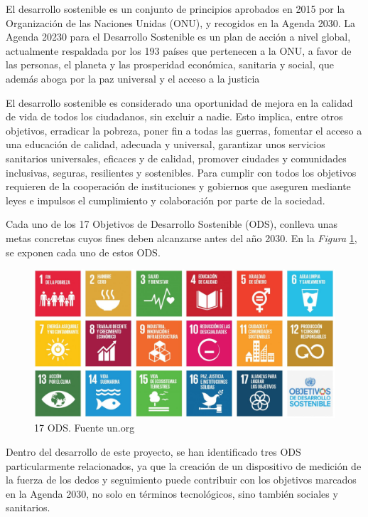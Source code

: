
El desarrollo sostenible es un conjunto de principios aprobados en 2015 por la Organización de las Naciones Unidas (ONU), y recogidos en la Agenda 2030. La Agenda 20230 para el Desarrollo Sostenible es un plan de acción a nivel global, actualmente respaldada por los 193 países que pertenecen a la ONU, a favor de las personas, el planeta y las prosperidad económica, sanitaria y social, que además aboga por la paz universal y el acceso a la justicia \cite{Agenda2030_gobierno}

El desarrollo sostenible es considerado una oportunidad de mejora en la calidad de vida de todos los ciudadanos, sin excluir a nadie. Esto implica, entre otros objetivos, erradicar la pobreza, poner fin a todas las guerras, fomentar el acceso a una educación de calidad, adecuada y universal, garantizar unos servicios sanitarios universales, eficaces y de calidad, promover ciudades y comunidades inclusivas, seguras, resilientes y sostenibles. Para cumplir con todos los objetivos requieren de la cooperación de instituciones y gobiernos que aseguren mediante leyes e impulsos el cumplimiento y colaboración por parte de la sociedad. \cite{ODS}

Cada uno de los 17 Objetivos de Desarrollo Sostenible (ODS), conlleva unas metas concretas cuyos fines deben alcanzarse antes del año 2030. En la \textit{Figura} \ref{fig:ODS}, se exponen cada uno de estos ODS.

\begin{figure}
    \centering
    \includegraphics[width=1\linewidth]{img/ODS.png}
    \caption{17 ODS. Fuente un.org}
    \label{fig:ODS}
\end{figure}

Dentro del desarrollo de este proyecto, se han identificado tres ODS particularmente relacionados, ya que la creación de un dispositivo de medición de la fuerza de los dedos y seguimiento puede contribuir con los objetivos marcados en la Agenda 2030, no solo en términos tecnológicos, sino también sociales y sanitarios.

